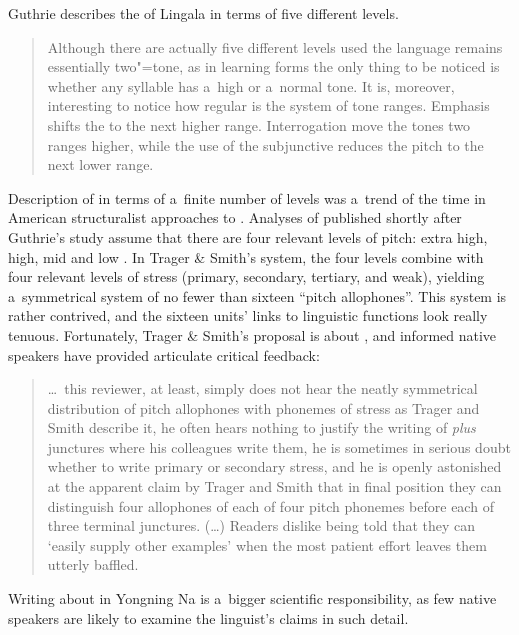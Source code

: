 Guthrie describes the  of Lingala in terms of five different levels. 
\begin{quotation}
	Although there are actually five different levels used the language remains essentially two"=tone, as in learning forms the only thing to be noticed is whether any syllable has a~high or a~normal tone. It is, moreover, interesting to notice how regular is the system of tone ranges. Emphasis shifts the  to the next higher range. Interrogation move the tones two ranges higher, while the use of the subjunctive reduces the pitch to the next lower range. \citep[475--476]{guthrie1940} 
\end{quotation}

Description of  in terms of a~finite number of levels was a~trend of the time in American structuralist approaches to . Analyses of   published shortly after Guthrie's study assume that there are four relevant levels of pitch: extra high, high, mid and low \citep[42]{pike1945, trageretal1951}. In Trager \& Smith's system, the four levels combine with four relevant levels of stress (primary, secondary, tertiary, and weak), yielding a~symmetrical system of no fewer than sixteen “pitch allophones''. This system is rather contrived, and the sixteen units' links to linguistic functions look really tenuous. Fortunately, Trager \& Smith's proposal is about , and informed native speakers have provided articulate critical feedback: 

\begin{quotation}
	{\dots}~this reviewer, at least, simply does not hear the neatly symmetrical distribution of pitch allophones with phonemes of stress as Trager and Smith describe it, he often hears nothing to justify the writing of \textit{plus} junctures where his colleagues write them, he is sometimes in serious doubt whether to write primary or secondary stress, and he is openly astonished at the apparent claim by Trager and Smith that in final position they can distinguish four allophones of each of four pitch phonemes before each of three terminal junctures. ({\dots}) Readers dislike being told that they can ‘easily supply other examples' when the most patient effort leaves them utterly baffled. \citep{sledd1955} 
\end{quotation}

{\noindent}Writing about  in Yongning Na is a~bigger scientific responsibility, as few native speakers are likely to examine the linguist's claims in such detail. 

